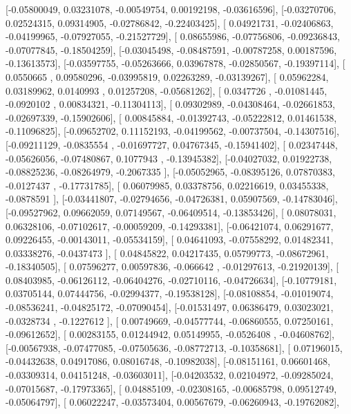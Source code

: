 \documentclass{article}
\begin{document}
       [-0.05800049,  0.03231078, -0.00549754,  0.00192198, -0.03616596],
       [-0.03270706,  0.02524315,  0.09314905, -0.02786842, -0.22403425],
       [ 0.04921731, -0.02406863, -0.04199965, -0.07927055, -0.21527729],
       [ 0.08655986, -0.07756806, -0.09236843, -0.07077845, -0.18504259],
       [-0.03045498, -0.08487591, -0.00787258,  0.00187596, -0.13613573],
       [-0.03597755, -0.05263666,  0.03967878, -0.02850567, -0.19397114],
       [ 0.0550665 ,  0.09580296, -0.03995819,  0.02263289, -0.03139267],
       [ 0.05962284,  0.03189962,  0.0140993 ,  0.01257208, -0.05681262],
       [ 0.0347726 , -0.01081445, -0.0920102 ,  0.00834321, -0.11304113],
       [ 0.09302989, -0.04308464, -0.02661853, -0.02697339, -0.15902606],
       [ 0.00845884, -0.01392743, -0.05222812,  0.01461538, -0.11096825],
       [-0.09652702,  0.11152193, -0.04199562, -0.00737504, -0.14307516],
       [-0.09211129, -0.0835554 , -0.01697727,  0.04767345, -0.15941402],
       [ 0.02347448, -0.05626056, -0.07480867,  0.1077943 , -0.13945382],
       [-0.04027032,  0.01922738, -0.08825236, -0.08264979, -0.2067335 ],
       [-0.05052965, -0.08395126,  0.07870383, -0.0127437 , -0.17731785],
       [ 0.06079985,  0.03378756,  0.02216619,  0.03455338, -0.0878591 ],
       [-0.03441807, -0.02794656, -0.04726381,  0.05907569, -0.14783046],
       [-0.09527962,  0.09662059,  0.07149567, -0.06409514, -0.13853426],
       [ 0.08078031,  0.06328106, -0.07102617, -0.00059209, -0.14293381],
       [-0.06421074,  0.06291677,  0.09226455, -0.00143011, -0.05534159],
       [ 0.04641093, -0.07558292,  0.01482341,  0.03338276, -0.0437473 ],
       [ 0.04845822,  0.04217435,  0.05799773, -0.08672961, -0.18340505],
       [ 0.07596277,  0.00597836, -0.066642  , -0.01297613, -0.21920139],
       [ 0.08403985, -0.06126112, -0.06404276, -0.02710116, -0.04726634],
       [-0.10779181,  0.03705144,  0.07444756, -0.02994377, -0.19538128],
       [-0.08108854, -0.01019074, -0.08536241, -0.04825172, -0.07090454],
       [-0.01531497,  0.06386479,  0.03023021, -0.0328734 , -0.1227612 ],
       [ 0.00749669, -0.04577744, -0.06860555,  0.07250161, -0.09612652],
       [ 0.00283155,  0.01244942,  0.05149955, -0.0526408 , -0.04608762],
       [-0.00567938, -0.07477085, -0.07505636, -0.08772713, -0.10358681],
       [ 0.07196015, -0.04432638,  0.04917086,  0.08016748, -0.10982038],
       [-0.08151161,  0.06601468, -0.03309314,  0.04151248, -0.03603011],
       [-0.04203532,  0.02104972, -0.09285024, -0.07015687, -0.17973365],
       [ 0.04885109, -0.02308165, -0.00685798,  0.09512749, -0.05064797],
       [ 0.06022247, -0.03573404,  0.00567679, -0.06260943, -0.19762082],
\end{document}
